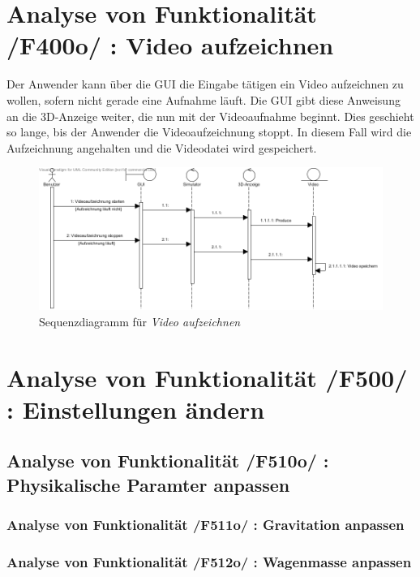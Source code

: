 \section{Analyse von Funktionalität /F400o/ :  Video aufzeichnen}
Der Anwender kann über die GUI die Eingabe tätigen ein Video aufzeichnen zu wollen, sofern nicht gerade eine Aufnahme läuft. Die GUI gibt diese Anweisung an die 3D-Anzeige weiter, die nun mit der
Videoaufnahme beginnt. Dies geschieht so lange, bis der Anwender die Videoaufzeichnung stoppt. In diesem Fall wird die Aufzeichnung angehalten und die Videodatei wird gespeichert.


\begin{figure}
\includegraphics[width=16cm]{bilder/Video_aufzeichnen}
\caption{Sequenzdiagramm für \textit{Video aufzeichnen}}
\label{labelname}
\end{figure}

\section{Analyse von Funktionalität /F500/ :  Einstellungen ändern}
\subsection{Analyse von Funktionalität /F510o/ :  Physikalische Paramter anpassen}
\subsubsection{Analyse von Funktionalität /F511o/ :  Gravitation anpassen}
\subsubsection{Analyse von Funktionalität /F512o/ :  Wagenmasse anpassen}
